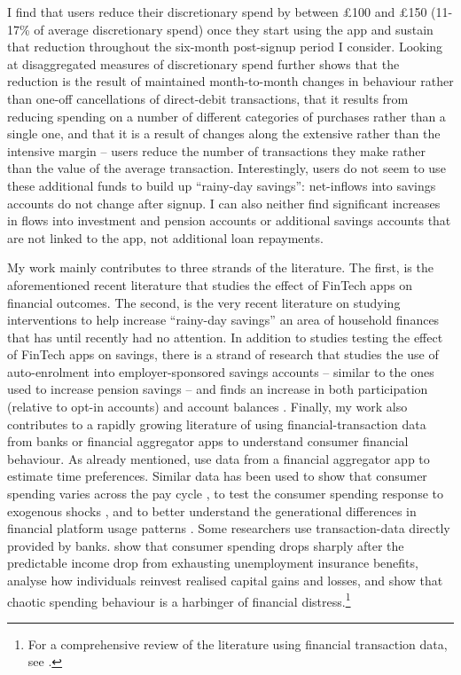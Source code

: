 I find that users reduce their discretionary spend by between \pounds100 and
\pounds150 (11-17\% of average discretionary spend) once they start using the
app and sustain that reduction throughout the six-month post-signup period I
consider. Looking at disaggregated measures of discretionary spend further
shows that the reduction is the result of maintained month-to-month changes in
behaviour rather than one-off cancellations of direct-debit transactions, that
it results from reducing spending on a number of different categories of
purchases rather than a single one, and that it is a result of changes along
the extensive rather than the intensive margin -- users reduce the number of
transactions they make rather than the value of the average transaction.
Interestingly, users do not seem to use these additional funds to build up
``rainy-day savings'': net-inflows into savings accounts do not change after
signup. I can also neither find significant increases in flows into investment
and pension accounts or additional savings accounts that are not linked to the
app, not additional loan repayments.

My work mainly contributes to three strands of the literature. The first, is the
aforementioned recent literature that studies the effect of FinTech apps on
financial outcomes. The second, is the very recent literature on studying
interventions to help increase ``rainy-day savings'' an area of household
finances that has until recently had no attention. In addition to studies
testing the effect of FinTech apps on savings, there is a strand of research
that studies the use of auto-enrolment into employer-sponsored savings accounts
-- similar to the ones used to increase pension savings \citep{thaler2004save,
choi2004better, choukhmane2019default} -- and finds an increase in both
participation (relative to opt-in accounts) and account balances
\citep{beshears2020building, berk2022automating}. Finally, my work also
contributes to a rapidly growing literature of using financial-transaction data
from banks or financial aggregator apps to understand consumer financial
behaviour. As already mentioned, \citet{kuchler2020sticking} use data from a
financial aggregator app to estimate time preferences. Similar data has been
used to show that consumer spending varies across the pay cycle
\citep{gelman2014harnessing,olafsson2018liquid}, to test the consumer spending
response to exogenous shocks \citep{baker2018debt,baugh2014disentangling}, and
to better understand the generational differences in financial platform usage
patterns \citep{carlin2019generational}. Some researchers use transaction-data
directly provided by banks. \citet{ganong2019consumer} show that consumer
spending drops sharply after the predictable income drop from exhausting
unemployment insurance benefits, \citet{meyer2018fully} analyse how individuals
reinvest realised capital gains and losses, and \citet{muggleton2020evidence}
show that chaotic spending behaviour is a harbinger of financial
distress.\footnote{For a comprehensive review of the literature using financial
transaction data, see \citet{baker2022household}.}

